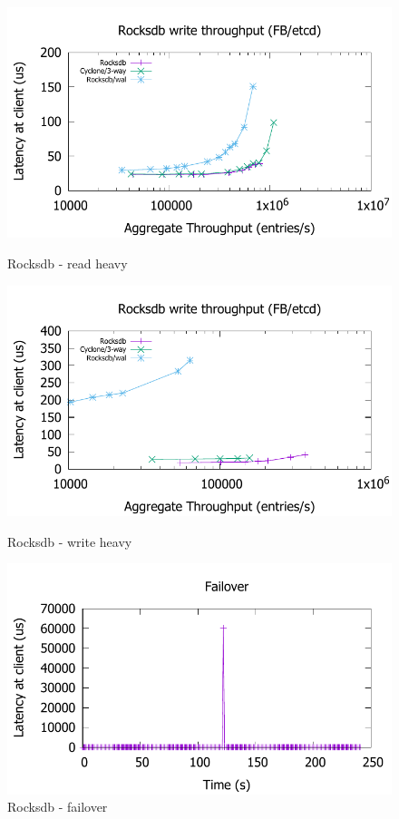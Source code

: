\documentclass[letterpaper,twocolumn,10pt]{article}
\begin{document}
\begin{figure}
\begin{minipage}{.33\textwidth}
\includegraphics[scale=0.45]{results2/fb.pdf}
\caption{Rocksdb - read heavy}
\label{fig:fb}
\end{minipage}
\begin{minipage}{.33\textwidth}
  \includegraphics[scale=0.45]{results2/fb2.pdf}
  \caption{Rocksdb - write heavy}
  \label{fig:fb2}
\end{minipage}
\begin{minipage}{.33\textwidth}
  \includegraphics[scale=0.45]{results2/failover.pdf}
  \caption{Rocksdb - failover}
  \label{fig:timeline}
\end{minipage}
\end{figure}
\end{document}
